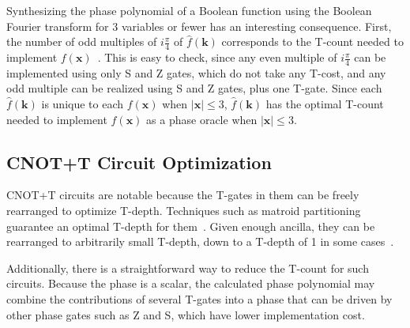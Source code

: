 Synthesizing the phase polynomial of a Boolean function using the Boolean Fourier
transform for 3 variables or fewer has an interesting consequence. First, the
number of odd multiples of $i\frac{\pi}{4}$ of $\hat{f}(\mathbf{k})$ corresponds to
the T-count needed to implement $f(\mathbf{x})$~\cite{bib-amy-rm}. This is easy to
check, since any even multiple of $i\frac{\pi}{4}$ can be implemented using only
S and Z gates, which do not take any T-cost, and any odd multiple can be realized
using S and Z gates, plus one T-gate. Since each $\hat{f}(\mathbf{k})$
is unique to each $f(\mathbf{x})$ when $|\mathbf{x}| \leq 3$,
$\hat{f}(\mathbf{k})$ has the optimal T-count needed to implement
$f(\mathbf{x})$ as a phase oracle when $|\mathbf{x}| \leq 3$.



\subsection{CNOT+T Circuit Optimization}
\label{Mot:CnotOpt}
CNOT+T circuits are notable because the T-gates in them can be freely rearranged to optimize T-depth.
Techniques such as matroid partitioning guarantee an optimal T-depth
for them~\cite{bib-amy-matroid}. Given enough ancilla, they can be rearranged to
arbitrarily small T-depth, down to a T-depth of 1 in some cases~\cite{bib-selinger-tdepth}.

Additionally, there is a straightforward way to reduce the T-count for such circuits.
Because the phase is a scalar, the calculated phase polynomial may combine the contributions of
several T-gates into a phase that can be driven by other phase gates such as Z and S, which
have lower implementation cost.

